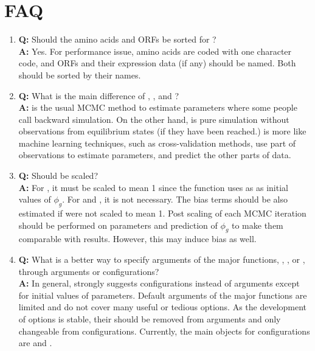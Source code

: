 
\section[FAQ]{FAQ}
\label{sec:faq}

\begin{enumerate}

\item {\bf\color{blue} Q:}
      Should the amino acids and ORFs be sorted for ? \\
      {\bf\color{blue} A:}
      Yes. For performance issue, amino acids are coded with one character
      code, and ORFs and their expression data (if any) should be named.
      Both should be sorted by their names.

\item {\bf\color{blue} Q:}
      What is the main difference of , , and
      ? \\
      {\bf\color{blue} A:}
       is the usual MCMC method to estimate parameters where
      some people call backward simulation.
      On the other hand,  is pure simulation without
      observations from equilibrium states (if they have been reached.)
       is more like machine learning techniques, such as
      cross-validation methods, use part of observations to estimate
      parameters, and predict the other parts of data.

\item {\bf\color{blue} Q:}
      Should  be scaled? \\
      {\bf\color{blue} A:}
      For , it must be scaled to mean 1 since the function uses
      as  as initial values of $\phi_g$.
      For  and , it is not necessary. The
      bias terms should be also estimated if  were not
      scaled to mean 1. Post scaling of each MCMC iteration should be
      performed on parameters and prediction of $\phi_g$ to make them
      comparable with  results. However, this may induce
      bias as well.

\item {\bf\color{blue} Q:}
      What is a better way to specify arguments of the major functions,
      , , or ,
      through arguments or configurations?\\
      {\bf\color{blue} A:}
      In general,  strongly suggests configurations instead of
      arguments except for initial values of parameters. Default arguments of
      the major functions are limited and do not cover many useful or tedious
      options. As the development of options is stable, their should be removed
      from arguments and only changeable from configurations. Currently,
      the main objects for configurations are  and .


\end{enumerate}
